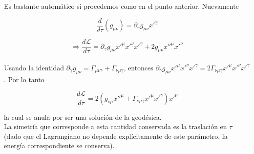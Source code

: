 Es bastante autom\'atico si procedemos como en el punto anterior. Nuevamente

$$\frac{d}{d\tau}(g_{\mu \nu}) = \partial_{\gamma}g_{\mu \nu}x'^{\gamma}$$

$$\Rightarrow \frac{d\mathcal{L}}{d\tau} = \partial_{\gamma}g_{\mu \nu}x'^{\mu}x'^{\nu}x'^{\gamma} + 2g_{\mu \nu}x''^{\mu}x'^{\nu}$$\\

Usando la identidad $\partial_{\gamma}g_{\mu \nu} = \Gamma_{\mu \nu \gamma} + \Gamma_{\nu \mu \gamma}$, entonces $\partial_{\gamma}g_{\mu\nu}x'^{\mu}x'^{\nu}x'^{\gamma} = 2\Gamma_{\nu \mu \gamma}x'^{\mu}x'^{\nu}x'^{\gamma}$. Por lo tanto

$$\frac{d\mathcal{L}}{d\tau} = 2(g_{\nu \mu}x''^{\mu} + \Gamma_{\nu \mu \gamma}x'^{\mu}x'^{\gamma})x'^{\nu}$$

la cual se anula por ser una soluci\'on de la geod\'esica.\\

La simetr\'ia que corresponde a esta cantidad conservada es la traslaci\'on en $\tau$ (dado que el Lagrangiano no depende expl\'icitamente de este par\'ametro, la energ\'ia correspondiente se conserva).
